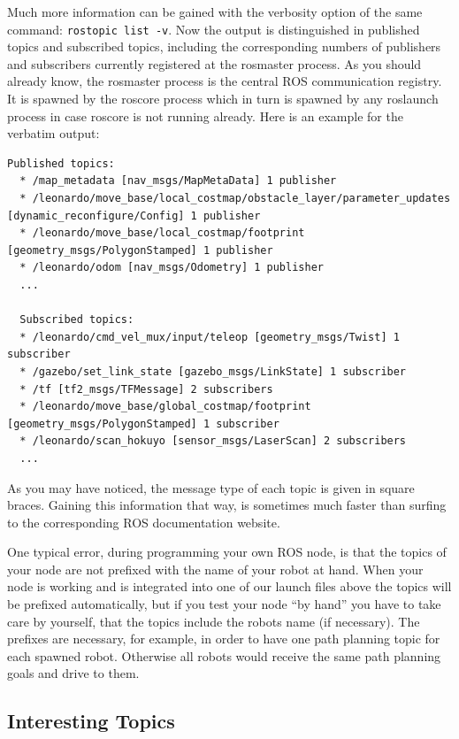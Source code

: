 Much more information can be gained with the verbosity option of the same command: \verb$rostopic list -v$. Now the output is distinguished in published topics and subscribed topics, including the corresponding numbers of publishers and subscribers currently registered at the rosmaster process. As you should already know, the rosmaster process is the central ROS communication registry. It is spawned by the roscore process which in turn is spawned by any roslaunch process in case roscore is not running already. Here is an example for the verbatim output:


\begin{Verbatim}[fontsize=\scriptsize]
  Published topics:
  * /map_metadata [nav_msgs/MapMetaData] 1 publisher
  * /leonardo/move_base/local_costmap/obstacle_layer/parameter_updates [dynamic_reconfigure/Config] 1 publisher
  * /leonardo/move_base/local_costmap/footprint [geometry_msgs/PolygonStamped] 1 publisher
  * /leonardo/odom [nav_msgs/Odometry] 1 publisher
  ...
  
  Subscribed topics:
  * /leonardo/cmd_vel_mux/input/teleop [geometry_msgs/Twist] 1 subscriber
  * /gazebo/set_link_state [gazebo_msgs/LinkState] 1 subscriber
  * /tf [tf2_msgs/TFMessage] 2 subscribers
  * /leonardo/move_base/global_costmap/footprint [geometry_msgs/PolygonStamped] 1 subscriber
  * /leonardo/scan_hokuyo [sensor_msgs/LaserScan] 2 subscribers
  ...
\end{Verbatim}

As you may have noticed, the message type of each topic is given in square braces. Gaining this information that way, is sometimes much faster than surfing to the corresponding ROS documentation website.

One typical error, during programming your own ROS node, is that the topics of your node are not prefixed with the name of your robot at hand. When your node is working and is integrated into one of our launch files above the topics will be prefixed automatically, but if you test your node ``by hand'' you have to take care by yourself, that the topics include the robots name (if necessary). The prefixes are necessary, for example, in order to have one path planning topic for each spawned robot. Otherwise all robots would receive the same path planning goals and drive to them. 

\subsection{Interesting Topics}
\label{ssec:InterestingTopics}

